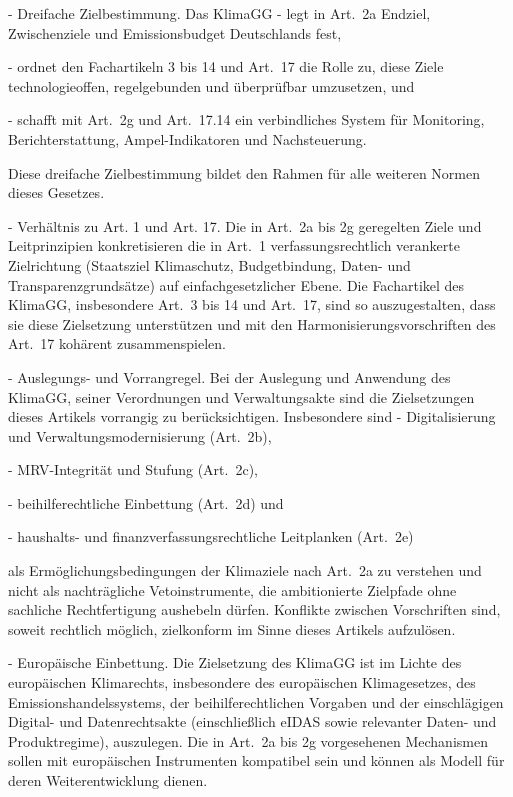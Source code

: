 \documentclass[12pt,a4paper]{scrartcl}
\begin{document}
- Dreifache Zielbestimmung. Das KlimaGG
- legt in Art. 2a Endziel, Zwischenziele und Emissionsbudget Deutschlands fest,

- ordnet den Fachartikeln 3 bis 14 und Art. 17 die Rolle zu, diese Ziele technologieoffen, regelgebunden und überprüfbar umzusetzen, und

- schafft mit Art. 2g und Art. 17.14 ein verbindliches System für Monitoring, Berichterstattung, Ampel-Indikatoren und Nachsteuerung.

    Diese dreifache Zielbestimmung bildet den Rahmen für alle weiteren Normen dieses Gesetzes.

- Verhältnis zu Art. 1 und Art. 17. Die in Art. 2a bis 2g geregelten Ziele und Leitprinzipien konkretisieren die in Art. 1 verfassungsrechtlich verankerte Zielrichtung (Staatsziel Klimaschutz, Budgetbindung, Daten- und Transparenzgrundsätze) auf einfachgesetzlicher Ebene. Die Fachartikel des KlimaGG, insbesondere Art. 3 bis 14 und Art. 17, sind so auszugestalten, dass sie diese Zielsetzung unterstützen und mit den Harmonisierungsvorschriften des Art. 17 kohärent zusammenspielen.

- Auslegungs- und Vorrangregel. Bei der Auslegung und Anwendung des KlimaGG, seiner Verordnungen und Verwaltungsakte sind die Zielsetzungen dieses Artikels vorrangig zu berücksichtigen. Insbesondere sind
- Digitalisierung und Verwaltungsmodernisierung (Art. 2b),

- MRV-Integrität und Stufung (Art. 2c),

- beihilferechtliche Einbettung (Art. 2d) und

- haushalts- und finanzverfassungsrechtliche Leitplanken (Art. 2e)

    als Ermöglichungsbedingungen der Klimaziele nach Art. 2a zu verstehen und nicht als nachträgliche Vetoinstrumente, die ambitionierte Zielpfade ohne sachliche Rechtfertigung aushebeln dürfen. Konflikte zwischen Vorschriften sind, soweit rechtlich möglich, zielkonform im Sinne dieses Artikels aufzulösen.

- Europäische Einbettung. Die Zielsetzung des KlimaGG ist im Lichte des europäischen Klimarechts, insbesondere des europäischen Klimagesetzes, des Emissionshandelssystems, der beihilferechtlichen Vorgaben und der einschlägigen Digital- und Datenrechtsakte (einschließlich eIDAS sowie relevanter Daten- und Produktregime), auszulegen. Die in Art. 2a bis 2g vorgesehenen Mechanismen sollen mit europäischen Instrumenten kompatibel sein und können als Modell für deren Weiterentwicklung dienen.
\end{document}
